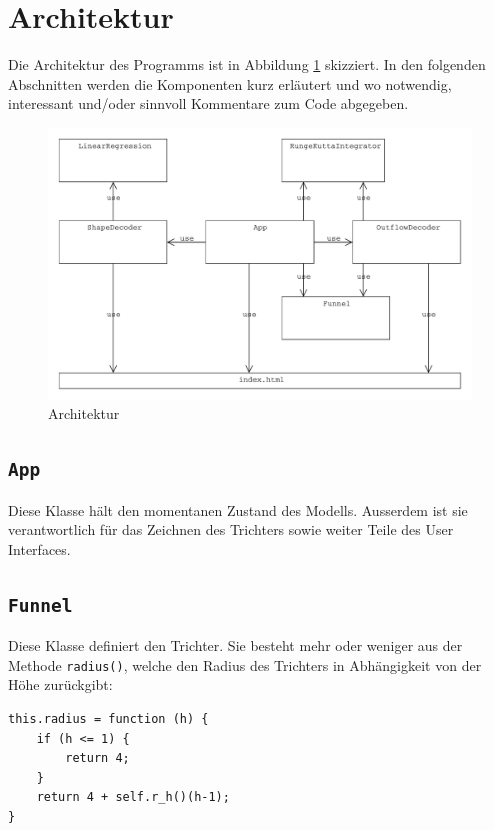 \documentclass[11pt]{scrreprt} %
\theoremstyle{definition}
\begin{document}
\section{Architektur}

Die Architektur des Programms ist in Abbildung \ref{architecture} skizziert. In den folgenden Abschnitten werden die Komponenten kurz erläutert und wo notwendig, interessant und/oder sinnvoll Kommentare zum Code abgegeben.

\begin{figure}
\caption{Architektur}
\label{architecture}
\begin{center}
\includegraphics[scale=0.5]{biltli/architecture.pdf}
\end{center}
\end{figure}


\subsection{{\tt App}}

Diese Klasse hält den momentanen Zustand des Modells. Ausserdem ist sie verantwortlich für das Zeichnen des Trichters sowie weiter Teile des User Interfaces.

\subsection{{\tt Funnel}}

Diese Klasse definiert den Trichter. Sie besteht mehr oder weniger aus der Methode {\tt radius()}, welche den Radius des Trichters in Abhängigkeit von der Höhe zurückgibt:

\begin{lstlisting}
this.radius = function (h) {
	if (h <= 1) {
		return 4;
	}
	return 4 + self.r_h()(h-1);
}
\end{lstlisting}
\end{document}
